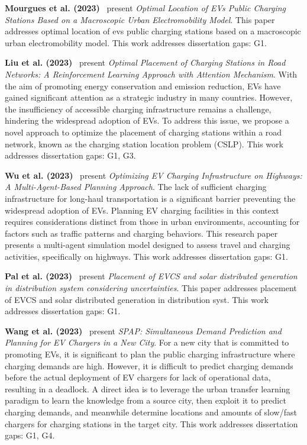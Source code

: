 \documentclass[letterpaper, 12pt, oneside, doublespacing]{Thesis}
\begin{document}
\noindent \textbf{Mourgues et al. (2023)}~\cite{optimal_location_2023} present \textit{Optimal Location of EVs Public Charging Stations Based on a Macroscopic Urban Electromobility Model}. This paper addresses optimal location of evs public charging stations based on a macroscopic urban electromobility model. This work addresses dissertation gaps: G1.



\noindent \textbf{Liu et al. (2023)}~\cite{optimal_placement_2023} present \textit{Optimal Placement of Charging Stations in Road Networks: A Reinforcement Learning Approach with Attention Mechanism}. With the aim of promoting energy conservation and emission reduction, EVs have gained significant attention as a strategic industry in many countries. However, the insufficiency of accessible charging infrastructure remains a challenge, hindering the widespread adoption of EVs. To address this issue, we propose a novel approach to optimize the placement of charging stations within a road network, known as the charging station location problem (CSLP). This work addresses dissertation gaps: G1, G3.



\noindent \textbf{Wu et al. (2023)}~\cite{optimizing_electric_2023} present \textit{Optimizing EV Charging Infrastructure on Highways: A Multi-Agent-Based Planning Approach}. The lack of sufficient charging infrastructure for long-haul transportation is a significant barrier preventing the widespread adoption of EVs. Planning EV charging facilities in this context requires considerations distinct from those in urban environments, accounting for factors such as traffic patterns and charging behaviors. This research paper presents a multi-agent simulation model designed to assess travel and charging activities, specifically on highways. This work addresses dissertation gaps: G1.



\noindent \textbf{Pal et al. (2023)}~\cite{placement_of_2023} present \textit{Placement of EVCS and solar distributed generation in distribution system considering uncertainties}. This paper addresses placement of EVCS and solar distributed generation in distribution syst. This work addresses dissertation gaps: G1.



\noindent \textbf{Wang et al. (2023)}~\cite{joint_planning_2023} present \textit{SPAP: Simultaneous Demand Prediction and Planning for EV Chargers in a New City}. For a new city that is committed to promoting EVs, it is significant to plan the public charging infrastructure where charging demands are high. However, it is difficult to predict charging demands before the actual deployment of EV chargers for lack of operational data, resulting in a deadlock. A direct idea is to leverage the urban transfer learning paradigm to learn the knowledge from a source city, then exploit it to predict charging demands, and meanwhile determine locations and amounts of slow/fast chargers for charging stations in the target city. This work addresses dissertation gaps: G1, G4.
\end{document}
